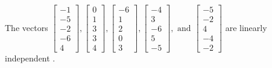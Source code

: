 \begin{exercise}
\begin{exerciseStatement}
  \end{exerciseStatement}
  \begin{exerciseAnswer}
   The vectors \(\left[\begin{array}{r}
-1 \\
-5 \\
-2 \\
-6 \\
4
\end{array}\right] , \left[\begin{array}{r}
0 \\
1 \\
3 \\
3 \\
4
\end{array}\right] , \left[\begin{array}{r}
-6 \\
1 \\
2 \\
0 \\
3
\end{array}\right] , \left[\begin{array}{r}
-4 \\
3 \\
-6 \\
5 \\
-5
\end{array}\right] , \text{ and } \left[\begin{array}{r}
-5 \\
-2 \\
4 \\
-4 \\
-2
\end{array}\right]\) are 
  	 linearly independent  .
  


  \end{exerciseAnswer}
\end{exercise}